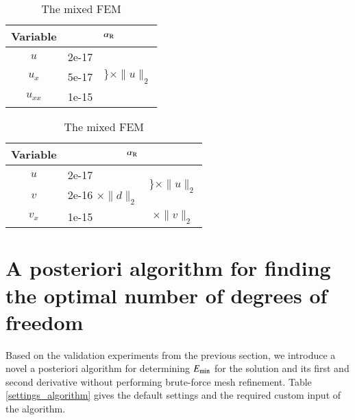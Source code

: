 \documentclass[review,3p]{elsarticle}
\begin{document}
\begin{table}[!ht]
\small
{}
\hspace{3.0cm}
\begin{subtable}{0.4\textwidth}
\caption{The standard FEM}
\label{relation_alpha_R_l2_norm_amended_std}
\begin{tabular}{c | l c}
\hline
Variable & \multicolumn{2}{c}{$\alpha_{\rm R}$} \\ \hline
$u$ & 2e-17 & \multirow{3}{*}{$\Bigg\}\times \|u\|_2$} \\ \cline{1-2}
$u_x$ & 5e-17 & \\ \cline{1-2}
$u_{xx}$ & 1e-15 & \\ \hline
\end{tabular}
\end{subtable}
\hspace{-2cm}
\begin{subtable}{.4\textwidth}
\caption{The mixed FEM}
\label{relation_alpha_R_l2_norm_amended_mix}
\begin{tabular}{c | l c}
\hline
Variable & \multicolumn{2}{c}{$\alpha_{\rm R}$} \\ \hline
$u$ & 2e-17 & \multirow{2}{*}{$\bigg\}\times\|u\|_2$} \\ \cline{1-2} 
$v$ & 2e-16 $\times \|d\|_2$ &  \\ \hline
$v_x$ & 1e-15 & $\times \|v\|_2$ \\ \hline
\end{tabular}
\end{subtable}
\label{relation_alpha_R_l2_norm_amended}
\end{table}


\newpage

\section{A posteriori algorithm for finding the optimal number of degrees of freedom}		\label{section_algorithm}

Based on the validation experiments from the previous section, we introduce a novel a posteriori algorithm for determining $E_{\rm min}$ for the solution and its first and second derivative without performing brute-force mesh refinement. 
Table \ref{settings_algorithm} gives the default settings and the required custom input of the algorithm.
\end{document}
